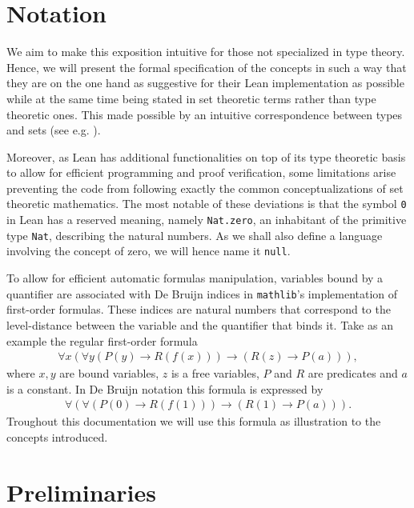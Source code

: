 
\chapter{Notation}\label{subsec:notation}
We aim to make this exposition intuitive for those not specialized in type theory. Hence, we will present the formal specification of the concepts in such a way that they are on the one hand as suggestive for their Lean implementation as possible while at the same time being stated in set theoretic terms rather than type theoretic ones. This made possible by an intuitive correspondence between types and sets (see e.g. \cite{nederpelt:1994}).

Moreover, as Lean has additional functionalities on top of its type theoretic basis to allow for efficient programming and proof verification, some limitations arise preventing the code from following exactly the common conceptualizations of set theoretic mathematics. The most notable of these deviations is that the symbol \texttt{0} in Lean has a reserved meaning, namely \texttt{Nat.zero}, an inhabitant of the primitive type \texttt{Nat}, describing the natural numbers. As we shall also define a language involving the concept of zero, we will hence name it \texttt{null}.

To allow for efficient automatic formulas manipulation, variables bound by a quantifier are associated with De Bruijn \cite{bruijn:1972} indices in \texttt{mathlib}'s implementation of first-order formulas. These indices are natural numbers that correspond to the level-distance between the variable and the quantifier that binds it. Take as an example the regular first-order formula 
\begin{align}
    \forall x (\forall y (P(y) \to R(f(x))) \to (R(z) \to P(a))),
\end{align} where $x, y$ are bound variables, $z$ is a free variables, $P$ and $R$ are predicates and $a$ is a constant.
In De Bruijn notation this formula is expressed by
\begin{align}\label{fml:db}
    \forall (\forall (P(0) \to R(f(1))) \to (R(1) \to P(a))).
\end{align}
Troughout this documentation we will use this formula as illustration to the concepts introduced.


\chapter{Preliminaries}
